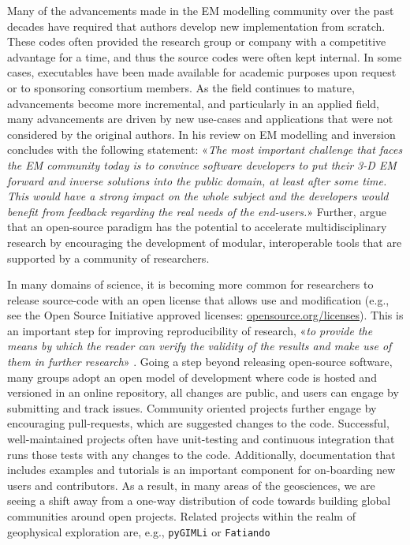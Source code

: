 \documentclass[
    paper,
  ]{geophysics}
\begin{document}
Many of the advancements made in the EM modelling community over the past decades have required that authors develop new implementation from scratch. These codes often provided the research group or company with a competitive advantage for a time, and thus the source codes were often kept internal. In some cases, executables have been made available for academic purposes upon request or to sponsoring consortium members. As the field continues to mature, advancements become more incremental, and particularly in an applied field, many advancements are driven by new use-cases and applications that were not considered by the original authors. In his review on EM modelling and inversion \cite{SG.05.Avdeev} concludes with the following statement: «\emph{The most important challenge that faces the EM community today is to convince software developers to put their 3-D EM forward and inverse solutions into the public domain, at least after some time. This would have a strong impact on the whole subject and the developers would benefit from feedback regarding the real needs of the end-users.}» Further, \cite{EXG.19.Oldenburg} argue that an open-source paradigm has the potential to accelerate multidisciplinary research by encouraging the development of modular, interoperable tools that are supported by a community of researchers.

In many domains of science, it is becoming more common for researchers to release source-code with an open license that allows use and modification (e.g., see the Open Source Initiative approved licenses: \href{https://opensource.org/licenses}{opensource.org/licenses}). This is an important step for improving reproducibility of research, «\emph{to provide the means by which the reader can verify the validity of the results and make use of them in further research}» \citep{GEO.17.Broggini}. Going a step beyond releasing open-source software, many groups adopt an open model of development where code is hosted and versioned in an online repository, all changes are public, and users can engage by submitting and track issues. Community oriented projects further engage by encouraging pull-requests, which are suggested changes to the code. Successful, well-maintained projects often have unit-testing and continuous integration that runs those tests with any changes to the code. Additionally, documentation that includes examples and tutorials is an important component for on-boarding new users and contributors. As a result, in many areas of the geosciences, we are seeing a shift away from a one-way distribution of code towards building global communities around open projects. Related projects within the realm of geophysical exploration are, e.g., \texttt{pyGIMLi} \citep{CAG.17.Rucker} or \texttt{Fatiando} \citep{JOSS.18.Uieda}
\end{document}
